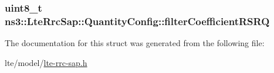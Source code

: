 \subsubsection[{\texorpdfstring{filter\+Coefficient\+R\+S\+RQ}{filterCoefficientRSRQ}}]{\setlength{\rightskip}{0pt plus 5cm}uint8\+\_\+t ns3\+::\+Lte\+Rrc\+Sap\+::\+Quantity\+Config\+::filter\+Coefficient\+R\+S\+RQ}\hypertarget{structns3_1_1LteRrcSap_1_1QuantityConfig_a5b8c0642e518d9410c533069a442f3f0}{}\label{structns3_1_1LteRrcSap_1_1QuantityConfig_a5b8c0642e518d9410c533069a442f3f0}


The documentation for this struct was generated from the following file\+:\begin{DoxyCompactItemize}
\item 
lte/model/\hyperlink{lte-rrc-sap_8h}{lte-\/rrc-\/sap.\+h}\end{DoxyCompactItemize}
